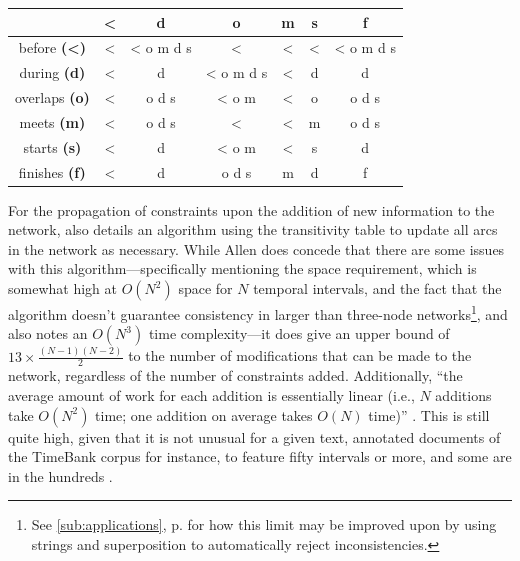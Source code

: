 \documentclass[a4paper,12pt,leqno]{article}
\makeatletter
\newcommand*\bigcdot{\mathpalette\bigcdot@{0.75}}
\newcommand*\bigcdot@[2]{\mathbin{\vcenter{\hbox{\scalebox{#2}{$\m@th#1\bullet$}}}}}
\makeatother
\begin{document}
\begin{center}
	\onehalfspacing
	\begin{tabular}{|c|c|c|c|c|c|c|}
		\hline
		\diagbox{$A \bigcdot B$}{$B \bigcdot' C$} & \textbf{\textless{}} & \textbf{d} & \textbf{o} & \textbf{m} & \textbf{s} & \textbf{f}\\
		\hline
		before \textbf{(\textless{})} & \textless{} & \textless{} o m d s & \textless{} & \textless{} & \textless{} & \textless{} o m d s\\
		\hline
		during \textbf{(d)} & \textless{} & d & \textless{} o m d s & \textless{} & d & d\\
		\hline
		overlaps \textbf{(o)} & \textless{} & o d s & \textless{} o m & \textless{} & o & o d s\\
		\hline
		meets \textbf{(m)} & \textless{} & o d s & \textless{} & \textless{} & m & o d s\\
		\hline
		starts \textbf{(s)} & \textless{} & d & \textless{} o m & \textless{} & s & d\\
		\hline
		finishes \textbf{(f)} & \textless{} & d & o d s & m & d & f\\
		\hline
	\end{tabular}
	\label{tab:allen-trans-table}
\end{center}
\label{other:allen-algo}For the propagation of constraints upon the addition of new information to the network, \citet[p. 835]{allen1983maintaining} also details an algorithm using the transitivity table to update all arcs in the network as necessary. While Allen does concede that there are some issues with this algorithm---specifically mentioning the space requirement, which is somewhat high at $O(N^2)$ space for $N$ temporal intervals, and the fact that the algorithm doesn't guarantee consistency in larger than three-node networks\footnote{See \cref{sub:applications}, p. \pageref{ex:str-inconsistency} for how this limit may be improved upon by using strings and superposition to automatically reject inconsistencies.}, and \citet[p. 219]{Verhagen2005} also notes an $O(N^3)$ time complexity---it does give an upper bound of $13 \times \frac{(N - 1)(N - 2)}{2}$ to the number of modifications that can be made to the network, regardless of the number of constraints added. Additionally, ``the average amount of work for each addition is essentially linear (i.e., $N$ additions take $O(N^2)$ time; one addition on average takes $O(N)$ time)'' \citep[p. 837]{allen1983maintaining}. This is still quite high, given that it is not unusual for a given text, annotated documents of the TimeBank \citep{pustejovsky2003timebank,pustejovsky2006timebank} corpus for instance, to feature fifty intervals or more, and some are in the hundreds \citep[p. 213]{Verhagen2005}.
\end{document}
